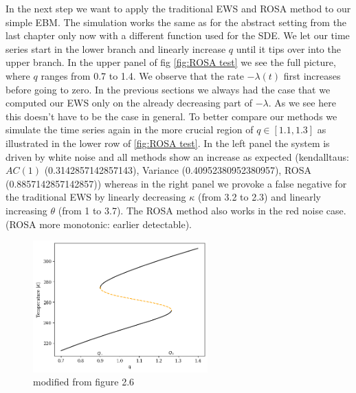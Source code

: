 \documentclass[%
thesis=student,%
coverpage=false,%
titlepage=false,%
headmarks=true, %
german,%
font=libertine, %
math=newpxtx, %
BCOR=5mm,%
coverBCOR=11mm%
]{tumbook}
\begin{document}
In the next step we want to apply the traditional EWS and ROSA method to our simple EBM.
The simulation works the same as for the abstract setting from the last chapter only now with a different function used for the SDE. We let our time series start in the lower branch and linearly increase $q$ until it tips over into the upper branch. In the upper panel of fig \ref{fig:ROSA test} we see the full picture, where $q$ ranges from 0.7 to 1.4. We observe that the rate $-\lambda(t)$ first increases before going to zero. In the previous sections we always had the case that we computed our EWS only on the already decreasing part of $-\lambda$. As we see here this doesn't have to be the case in general. To better compare our methods we simulate the time series again in the more crucial region of $q \in [1.1,1.3]$ as illustrated in the lower row of \ref{fig:ROSA test}. In the left panel the system is driven by white noise and all methods show an increase as expected (kendalltaus: $AC(1)$ (0.3142857142857143), Variance (0.40952380952380957), ROSA (0.8857142857142857)) whereas in the right panel we provoke a false negative for the traditional EWS by linearly decreasing $\kappa$ (from 3.2 to 2.3) and linearly increasing $\theta$ (from 1 to 3.7). The ROSA method also works in the red noise case. (ROSA more monotonic: earlier detectable).

\begin{figure}[t]
    \centering
    \includegraphics[width=0.6\textwidth]{bachelor-thesis/figures/se_bif_plot.png}
    \caption{modified from \cite{Kaper:2013} figure 2.6}
    \label{fig:se_bif}
\end{figure}
\end{document}
